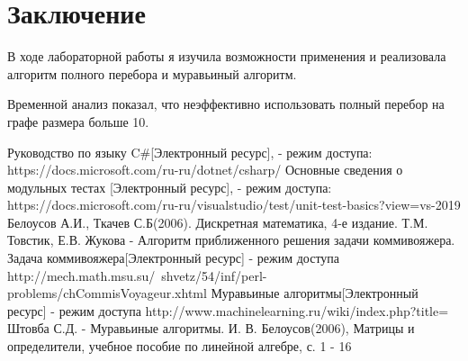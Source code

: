 \documentclass[12pt]{report}
\begin{document}
\chapter*{Заключение}
В ходе лабораторной работы я изучила возможности применения и реализовала алгоритм полного перебора и муравьиный алгоритм. 

Временной анализ показал, что неэффективно использовать полный перебор на графе размера больше 10.

 \begin{thebibliography}{3}
Руководство по языку C\#[Электронный ресурс], - режим доступа: https://docs.microsoft.com/ru-ru/dotnet/csharp/
Основные сведения о модульных тестах [Электронный ресурс], - режим доступа: https://docs.microsoft.com/ru-ru/visualstudio/test/unit-test-basics?view=vs-2019
 Белоусов А.И., Ткачев С.Б(2006). Дискретная математика, 4-е издание.
 Т.М. Товстик, Е.В. Жукова - Алгоритм приближенного решения задачи коммивояжера.
 Задача коммивояжера[Электронный ресурс] - режим доступа http://mech.math.msu.su/~shvetz/54/inf/perl-problems/chCommisVoyageur.xhtml
 Муравьиные алгоритмы[Электронный ресурс] - режим доступа http://www.machinelearning.ru/wiki/index.php?title=%
 Штовба С.Д. - Муравьиные алгоритмы.
 И. В. Белоусов(2006), Матрицы и определители, учебное пособие по линейной алгебре, с. 1 - 16
\end{thebibliography}
\end{document}
